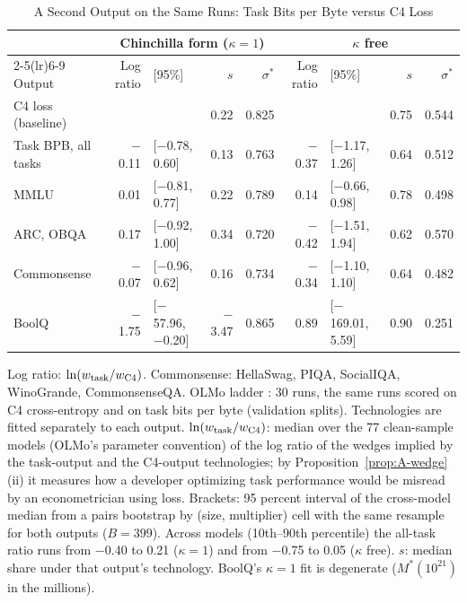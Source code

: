 \begin{table}[tp]
\centering
\caption{A Second Output on the Same Runs: Task Bits per Byte versus C4 Loss}
\label{tab:app-second-output}
\footnotesize
\setlength{\tabcolsep}{2.5pt}
\begin{tabular}{@{}lrlrrrlrr@{}}
\toprule
& \multicolumn{4}{c}{Chinchilla form ($\kappa=1$)} & \multicolumn{4}{c}{$\kappa$ free} \\
\cmidrule(lr){2-5}\cmidrule(lr){6-9}
Output & Log ratio & {\scriptsize[95\%]} & $s$ & $\sigma^*$ & Log ratio & {\scriptsize[95\%]} & $s$ & $\sigma^*$ \\
\midrule
C4 loss (baseline) & & & 0.22 & 0.825 & & & 0.75 & 0.544 \\
Task BPB, all tasks & $-$0.11 & {\scriptsize[$-$0.78, 0.60]} & 0.13 & 0.763 & $-$0.37 & {\scriptsize[$-$1.17, 1.26]} & 0.64 & 0.512 \\
\quad MMLU & 0.01 & {\scriptsize[$-$0.81, 0.77]} & 0.22 & 0.789 & 0.14 & {\scriptsize[$-$0.66, 0.98]} & 0.78 & 0.498 \\
\quad ARC, OBQA & 0.17 & {\scriptsize[$-$0.92, 1.00]} & 0.34 & 0.720 & $-$0.42 & {\scriptsize[$-$1.51, 1.94]} & 0.62 & 0.570 \\
\quad Commonsense & $-$0.07 & {\scriptsize[$-$0.96, 0.62]} & 0.16 & 0.734 & $-$0.34 & {\scriptsize[$-$1.10, 1.10]} & 0.64 & 0.482 \\
\quad BoolQ & $-$1.75 & {\scriptsize[$-$57.96, $-$0.20]} & $-$3.47 & 0.865 & 0.89 & {\scriptsize[$-$169.01, 5.59]} & 0.90 & 0.251 \\
\bottomrule
\end{tabular}
\medskip
\begin{tablenotes}
Log ratio: $\ln(w_{\rm task}/w_{\rm C4})$. Commonsense: HellaSwag, PIQA, SocialIQA, WinoGrande, CommonsenseQA. OLMo ladder \citep{bhagia2024establishing}: 30 runs, the same runs scored on C4 cross-entropy and on task bits per byte (validation splits). Technologies are fitted separately to each output. $\ln(w_{\rm task}/w_{\rm C4})$: median over the 77 clean-sample models (OLMo's parameter convention) of the log ratio of the wedges implied by the task-output and the C4-output technologies; by Proposition~\ref{prop:A-wedge}(ii) it measures how a developer optimizing task performance would be misread by an econometrician using loss. Brackets: 95 percent interval of the cross-model median from a pairs bootstrap by (size, multiplier) cell with the same resample for both outputs ($B=399$). Across models (10th--90th percentile) the all-task ratio runs from $-$0.40 to 0.21 ($\kappa=1$) and from $-$0.75 to 0.05 ($\kappa$ free). $s$: median share under that output's technology. BoolQ's $\kappa=1$ fit is degenerate ($M^*(10^{21})$ in the millions).
\end{tablenotes}
\end{table}
